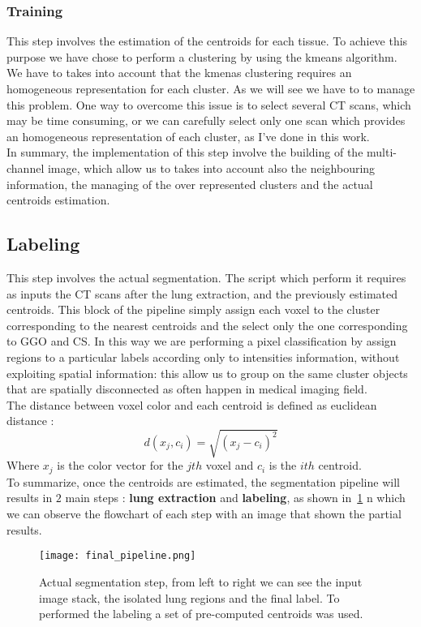 \documentclass{standalone}
\begin{document}
	\subsubsection*{Training}
	
	This step involves the estimation of the centroids for each tissue. To achieve this purpose we have chose to perform a clustering by using the kmeans algorithm. We have to takes into account that the kmenas clustering requires an homogeneous representation for each cluster. As we will see we have to to manage this problem. One way to overcome this issue is to select several CT scans, which may be time consuming, or we can carefully select only one scan which provides an homogeneous representation of each cluster, as I've done in this work.\\
	In summary, the implementation of this step involve the building of the multi-channel image, which allow us to takes into account also the neighbouring information, the managing of the over represented clusters  and the actual centroids estimation.

	\subsection*{Labeling}
	
	This step involves the actual segmentation. The script which perform it requires as inputs the CT scans after the lung extraction, and the previously estimated centroids. This block of the pipeline simply assign each voxel to the cluster corresponding to the nearest centroids and the select only the one corresponding to GGO and CS. In this way we are performing a pixel classification by assign regions to a particular labels according only to intensities information, without exploiting spatial information: this allow us to group on the same cluster objects that are spatially disconnected as often happen in medical imaging field.\\
	The distance between voxel color and each centroid is defined as euclidean distance :
	\begin{equation*}
		d(x_j, c_i) = \sqrt{(x_j - c_i)^2}
	\end{equation*} 
	Where $x_j$ is the color vector for the $jth$ voxel and $c_i$ is the $ith$ centroid.\\
	
	To summarize, once the centroids are estimated, the segmentation pipeline will results in $2$ main steps : \textbf{lung extraction} and \textbf{labeling}, as shown in  \figurename\,\ref{fig:FinalPipeline} n which we can observe the flowchart of each step with an image that shown the partial results.
	
	\begin{figure}
		\centering
			\texttt{[image: final\_pipeline.png]}
			\label{fig:FinalPipeline}\caption{Actual segmentation step, from left to right we can see the input image stack, the isolated lung regions and the final label. To performed the labeling a set of pre-computed centroids was used.}
	\end{figure}
	
	
	
\end{document}
